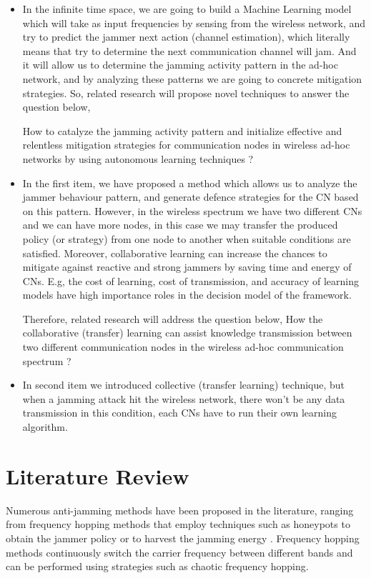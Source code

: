 \documentclass[letterpaper%
, twoside%
, 12pt%
,thesepararticles%
, english%
,creativecommons,hyperref, withAlgo2e%
]{thETS}
\begin{document}
\begin{itemize}
 \item {In the infinite time space, we are going to build a Machine Learning model which will take as input frequencies by sensing from the wireless network, and try to predict the jammer next action (channel estimation), which literally means that try to determine the next communication channel will jam. And it will allow us to determine the jamming activity pattern in the ad-hoc network, and by analyzing these patterns we are going to concrete  mitigation strategies. So, related research will propose novel techniques to answer the question below,
     
     How to catalyze the jamming activity pattern and initialize effective and relentless mitigation strategies for communication nodes in wireless ad-hoc networks by using autonomous learning techniques ?}
 \item {In the first item, we have proposed a method which allows us to analyze the jammer behaviour pattern, and generate defence strategies for the CN based on this pattern. However, in the wireless spectrum we have two different CNs and we can have more nodes, in this case we may transfer the produced policy (or strategy) from one node to another when suitable conditions are satisfied. Moreover, collaborative learning can increase the chances to mitigate against reactive and strong jammers by saving time and energy of CNs. E.g, the cost of learning, cost of transmission, and accuracy of learning models have  high importance roles in the decision model of the framework. 
  
 	Therefore, related research will address the question below, 
 	How the collaborative (transfer) learning can assist knowledge transmission between two different communication nodes in the wireless ad-hoc communication spectrum ? 
 }

 \item{In second item we introduced collective (transfer learning) technique, but when a jamming attack hit the wireless network, there won't be any data transmission in this condition, each CNs have to run their own learning algorithm. } 
\end{itemize}




\chapter{Literature Review}

Numerous anti-jamming methods have been proposed in the literature, ranging from frequency hopping \cite{6117758} \cite{8567751} methods that employ techniques such as honeypots to obtain the jammer policy or to harvest the jamming energy \cite{Bhunia2018CRHoneynetAC} \cite{9149223}. Frequency hopping methods continuously switch the carrier frequency between different bands and can be performed using strategies such as chaotic frequency hopping.
\end{document}

